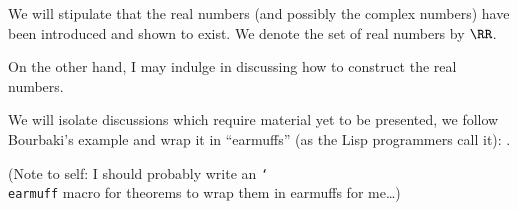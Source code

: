 \begin{remark}
We will stipulate that the real numbers (and possibly the complex
numbers) have been introduced and shown to exist. We denote the set of
real numbers by $\RR$.

On the other hand, I may indulge in discussing how to construct the
real numbers.
\end{remark}

\begin{remark}
We will isolate discussions which require material yet to be
presented, we follow Bourbaki's example and wrap it in ``earmuffs''
(as the Lisp programmers call it): \future{$\cdots$}.

(Note to self: I should probably write an \texttt{\char`\\earmuff} macro for
theorems to wrap them in earmuffs for me\dots)
\end{remark}